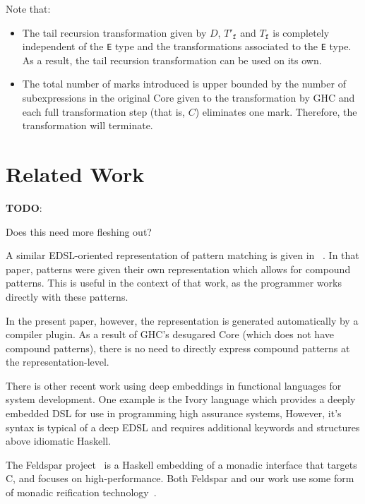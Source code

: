 \documentclass[sigplan,anonymous,review]{acmart}
\newcommand{\ttt}{\texttt}
\newenvironment{todo}
  {\begin{tcolorbox}
   \textbf{TODO}:
  }
  {\end{tcolorbox}
  }
\begin{document}
\clearpage

Note that:
\begin{itemize}
  \item The tail recursion transformation given by $D$, $T'_{\ttt{f}}$ and $T_{\ttt{f}}$ is completely independent of the \ttt{E} type and the transformations associated to the \ttt{E} type. As a result, the tail recursion transformation can be used on its own.

  \item The total number of marks introduced is upper bounded by the number of
subexpressions in the original Core given to the transformation by GHC and each
full transformation step (that is, $C$) eliminates one mark. Therefore, the
transformation will terminate.
\end{itemize}

\clearpage
\section{Related Work}
\begin{todo}
  Does this need more fleshing out?
\end{todo}

A similar EDSL-oriented representation of pattern matching is given in
~\cite[Section~3.3]{Atkey:09:Unembedding}. In that paper, patterns were given their own
representation which allows for compound patterns. This is useful in the context
of that work, as the programmer works directly with these patterns.

In the present paper, however, the representation is generated automatically by
a compiler plugin. As a result of GHC's desugared Core (which does not have
compound patterns), there is no need to directly express compound patterns at
the representation-level.

There is other recent work using deep embeddings in functional languages for 
system development.  One example is the Ivory language \cite{Elliott2015-Ivory} 
which provides a deeply embedded DSL for use in programming high assurance
systems,  However, it's syntax is typical of a deep EDSL and requires additional 
keywords and structures above idiomatic Haskell.

The Feldspar project~\cite{Axelsson:10:Feldspar,Svenningsson:13:Combining}
is a Haskell embedding of a monadic interface
that targets C, and focuses on high-performance.  Both Feldspar and our work use 
some form of monadic reification 
technology~\cite{Persson:11:MonadicDSL,Svenningsson:13:Compositional,Sculthorpe:13:ConstrainedMonad}.
\end{document}

